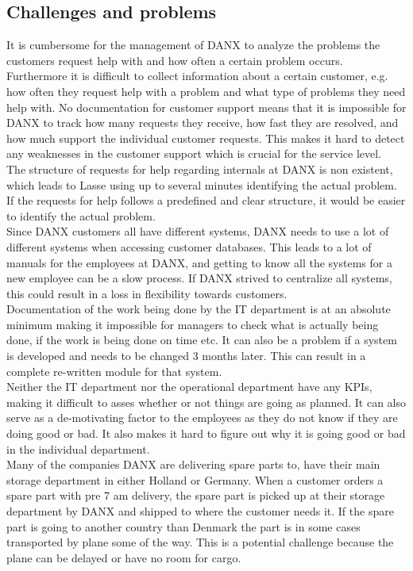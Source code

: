 \subsection{Challenges and problems}
It is cumbersome for the management of DANX to analyze the problems the customers request help with and how often a certain problem occurs.\cite{gert012} Furthermore it is difficult to collect information about a certain customer, e.g. how often they request help with a problem and what type of problems they need help with. No documentation for customer support means that it is impossible for DANX to track how many requests they receive, how fast they are resolved, and how much support the individual customer requests.\cite{gert011}\cite{gert012}
This makes it hard to detect any weaknesses in the customer support which is crucial for the service level. \\
The structure of requests for help regarding internals at DANX is non existent, which leads to Lasse using up to several minutes identifying the actual problem.\cite{lasse010} If the requests for help follows a predefined and clear structure, it would be easier to identify the actual problem. \\

Since DANX customers all have different systems, DANX needs to use a lot of different systems when accessing customer databases.\cite{lasse019} This leads to a lot of manuals for the employees at DANX, and getting to know all the systems for a new employee can be a slow process.\cite{opemployee001} If DANX strived to centralize all systems, this could result in a loss in flexibility towards customers. \\

Documentation of the work being done by the IT department is at an absolute minimum\cite{lasse007} making it impossible for managers to check what is actually being done, if the work is being done on time etc.
It can also be a problem if a system is developed and needs to be changed 3 months later. This can result in a complete re-written module for that system.\cite{lahib001} \\
Neither the IT department nor the operational department have any KPIs\cite{gert011}, making it difficult to asses whether or not things are going as planned. It can also serve as a de-motivating factor to the employees as they do not know if they are doing good or bad. It also makes it hard to figure out why it is going good or bad in the individual department. \\
Many of the companies DANX are delivering spare parts to, have their main storage department in either Holland\cite{gert001} or Germany\cite{gert002}. When a customer orders a spare part with pre 7 am delivery, the spare part is picked up at their storage department by DANX and shipped to where the customer needs it. If the spare part is going to another country than Denmark the part is in some cases transported by plane some of the way. This is a potential challenge because the plane can be delayed or have no room for cargo.
